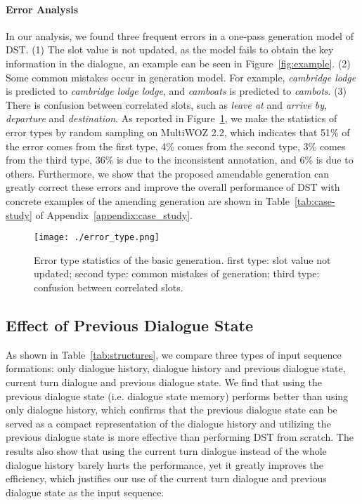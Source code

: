 \documentclass[11pt]{article}
\begin{document}
\paragraph{Error Analysis} In our analysis, we found three frequent errors in a one-pass generation model of DST. (1) The slot value is not updated, as the model fails to obtain the key information in the dialogue, an example can be seen in Figure~\ref{fig:example}. (2) Some common mistakes occur in generation model. For example, \textit{cambridge lodge} is predicted to \textit{cambridge lodge lodge}, and \textit{camboats} is predicted to \textit{cambots}. (3) There is confusion between correlated slots, such as \textit{leave at} and \textit{arrive by}, \textit{departure} and \textit{destination}. As reported in Figure~\ref{fig:error_type}, we make the statistics of error types by random sampling on MultiWOZ 2.2, which indicates that 51\% of the error comes from the first type, 4\% comes from the second type, 3\% comes from the third type, 36\% is due to the inconsistent annotation, and 6\% is due to others. 
Furthermore, we show that the proposed amendable generation can greatly correct these errors and improve the overall performance of DST with concrete examples of the amending generation are shown in Table~\ref{tab:case-study} of Appendix~\ref{appendix:case_study}. 


\begin{figure}
	\centering
	\texttt{[image: ./error\_type.png]}
	\caption{Error type statistics of the basic generation. first type: slot value not updated; second type: common mistakes of generation; third type: confusion between correlated slots.}
	\label{fig:error_type}
\end{figure} 

\subsection{Effect of Previous Dialogue State}
As shown in Table~\ref{tab:structures}, we compare three types of input sequence formations: only dialogue history, dialogue history and previous dialogue state, current turn dialogue and previous dialogue state. We find that using the previous dialogue state (i.e. dialogue state memory) performs better than using only dialogue history, which confirms that the previous dialogue state can be served as a compact representation of the dialogue history and utilizing the previous dialogue state is more effective than performing DST from scratch. The results also show that using the current turn dialogue instead of the whole dialogue history barely hurts the performance, yet it greatly improves the efficiency, which justifies our use of the current turn dialogue and previous dialogue state as the input sequence.
\end{document}
